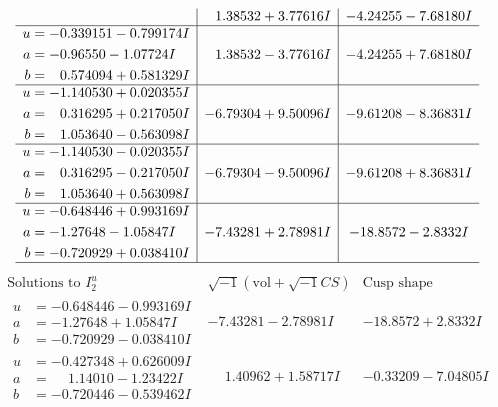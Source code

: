 \documentclass[1p]{elsarticle_modified}
\theoremstyle{definition}
\newcommand{\I}{\sqrt{-1}}
\begin{document}
$$\begin{array}{c|c|c}
 & \phantom{-}1.38532 + 3.77616 I & -4.24255 - 7.68180 I \\ \hline\begin{aligned}
u &= -0.339151 - 0.799174 I \\
a &= -0.96550 - 1.07724 I \\
b &= \phantom{-}0.574094 + 0.581329 I\end{aligned}
 & \phantom{-}1.38532 - 3.77616 I & -4.24255 + 7.68180 I \\ \hline\begin{aligned}
u &= -1.140530 + 0.020355 I \\
a &= \phantom{-}0.316295 + 0.217050 I \\
b &= \phantom{-}1.053640 - 0.563098 I\end{aligned}
 & -6.79304 + 9.50096 I & -9.61208 - 8.36831 I \\ \hline\begin{aligned}
u &= -1.140530 - 0.020355 I \\
a &= \phantom{-}0.316295 - 0.217050 I \\
b &= \phantom{-}1.053640 + 0.563098 I\end{aligned}
 & -6.79304 - 9.50096 I & -9.61208 + 8.36831 I \\ \hline\begin{aligned}
u &= -0.648446 + 0.993169 I \\
a &= -1.27648 - 1.05847 I \\
b &= -0.720929 + 0.038410 I\end{aligned}
 & -7.43281 + 2.78981 I & -18.8572 - 2.8332 I\\
 \hline 
 \end{array}$$\newpage$$\begin{array}{c|c|c}  
\text{Solutions to }I^u_{2}& \I (\text{vol} + \sqrt{-1}CS) & \text{Cusp shape}\\
 \hline 
\begin{aligned}
u &= -0.648446 - 0.993169 I \\
a &= -1.27648 + 1.05847 I \\
b &= -0.720929 - 0.038410 I\end{aligned}
 & -7.43281 - 2.78981 I & -18.8572 + 2.8332 I \\ \hline\begin{aligned}
u &= -0.427348 + 0.626009 I \\
a &= \phantom{-}1.14010 - 1.23422 I \\
b &= -0.720446 - 0.539462 I\end{aligned}
 & \phantom{-}1.40962 + 1.58717 I & -0.33209 - 7.04805 I \\ \hline\begin{aligned}

\end{aligned}
\end{array}$$
\end{document}
